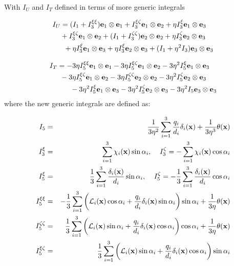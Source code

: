 With $I_U$ and $I_T$ defined in terms of more generic integrals

\begin{equation}
	\begin{multlined}
	I_U = (I_1 + I_3^{\xi\xi})\dyad{\e_1}{\e_1} + I_3^{\xi\zeta}\dyad{\e_1}{\e_2} + \eta I_3^{\xi}\dyad{\e_1}{\e_3} \\
	+ I_3^{\xi\zeta}\dyad{\e_1}{\e_2} + (I_1 + I_3^{\zeta\zeta})\dyad{\e_2}{\e_2} + \eta I_3^{\zeta}\dyad{\e_2}{\e_3} \\
	+ \eta I_3^{\xi}\dyad{\e_1}{\e_3} + \eta I_3^{\xi}\dyad{\e_2}{\e_3} + (I_1 + \eta^{2}I_3)\dyad{\e_3}{\e_3}
	\end{multlined}
\end{equation}

\begin{equation}
	\begin{multlined}
	I_T = -3\eta I_5^{\xi\xi}\dyad{\e_1}{\e_1} - 3\eta I_5^{\xi\zeta}\dyad{\e_1}{\e_2} - 3\eta^{2}I_5^{\xi}\dyad{\e_1}{\e_3} \\
	-3\eta I_5^{\xi\zeta}\dyad{\e_1}{\e_2} -3\eta I_5^{\zeta\zeta}\dyad{\e_2}{\e_2} -3\eta^{2}I_5^{\zeta}\dyad{\e_2}{\e_3} \\
	-3\eta^{2}I_5^{\xi}\dyad{\e_1}{\e_3} -3\eta^{2}I_5^{\zeta}\dyad{\e_2}{\e_3} -3\eta^{2}I_5\dyad{\e_3}{\e_3}
	\end{multlined}
\end{equation}
where the new generic integrals are defined as:

\begin{eqnarray*}
	I_5 & = & \frac{1}{3\eta^{2}}\sum_{i=1}^{3}\frac{q_i}{d_i}\delta_i(\mathbf{x}) + \frac{1}{3\eta^{3}}\theta(\mathbf{x}) \\
	I_3^{\xi} & = & \sum_{i=1}^{3} \chi_i(\mathbf{x})\sin\alpha_i,\;\;\;\;I_3^{\zeta} = -\sum_{i=1}^{3} \chi_i(\mathbf{x})\cos\alpha_i \\
	I_5^{\xi} & = & \frac{1}{3}\sum_{i=1}^{3}\frac{\delta_i(\mathbf{x})}{d_i}\sin\alpha_i,\;\;\;\;I_5^{\zeta} = -\frac{1}{3}\sum_{i=1}^{3}\frac{\delta_i(\mathbf{x})}{d_i}\cos\alpha_i \\
	I_5^{\xi\xi} & = & -\frac{1}{3}\sum_{i=1}^{3}\left ( \mathcal{L}_i(\mathbf{x})\cos\alpha_i + \frac{q_i}{d_i}\delta_i(\mathbf{x})\sin\alpha_i \right )\sin\alpha_i + \frac{1}{3\eta}\theta(\mathbf{x}) \\ 
	I_5^{\zeta\zeta} & = & \frac{1}{3}\sum_{i=1}^{3}\left ( \mathcal{L}_i(\mathbf{x})\sin\alpha_i + \frac{q_i}{d_i}\delta_i(\mathbf{x})\cos\alpha_i \right )\cos\alpha_i + \frac{1}{3\eta}\theta(\mathbf{x}) \\
	I_5^{\xi\zeta} & = & \frac{1}{3}\sum_{i=1}^{3}\left ( \mathcal{L}_i(\mathbf{x})\sin\alpha_i + \frac{q_i}{d_i}\delta_i(\mathbf{x})\cos\alpha_i \right )\sin\alpha_i
\end{eqnarray*}

